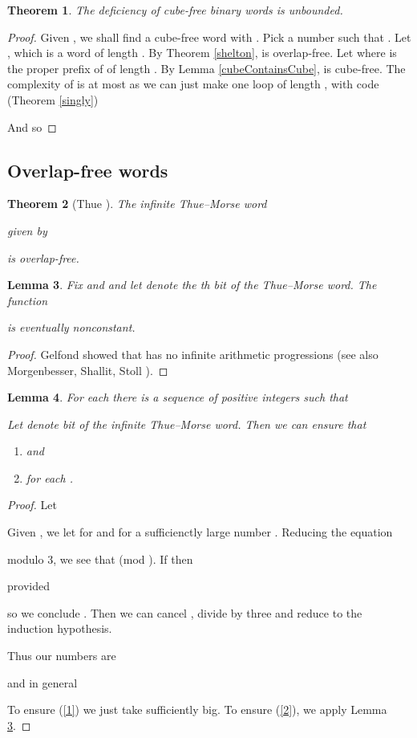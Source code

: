 \documentclass[12pt]{article}
\newcommand{\cubefree}{cube-free}
\theoremstyle{plain}
\newtheorem{thm}{Theorem}
\newtheorem{lem}[thm]{Lemma}
\theoremstyle{definition}
\theoremstyle{remark}
\begin{document}
			\begin{thm}
				The deficiency of {\cubefree} binary words is unbounded.
			\end{thm}
			\begin{proof}
				Given , we shall find a {\cubefree} word  with .
				Pick a number  such that .
				Let , which is a word of length .
				By Theorem \ref{shelton},  is overlap-free.
				Let  where  is the proper prefix of  of length .
				By Lemma \ref{cubeContainsCube},  is {\cubefree}.
				The complexity of  is at most  as
				we can just make one loop of length , with code (Theorem \ref{singly})
				
				And so
				
			\end{proof}
		\subsection{Overlap-free words}
			\begin{thm}[Thue \cite{ThueTwo}]\label{thueStrong}
				The infinite Thue--Morse word
				
				given by
				
				is overlap-free.
			\end{thm}
			\begin{lem}\label{gelfond}
				Fix  and  and let  denote the th bit of the Thue--Morse word. The function
				
				is eventually nonconstant.
			\end{lem}
			\begin{proof}
				Gelfond \cite{MR0220693} showed that  has no infinite arithmetic progressions
				(see also Morgenbesser, Shallit, Stoll \cite{MR2793891}).
			\end{proof}

			\begin{lem}\label{triple9:12:17}
				For each  there is a sequence  of positive integers such that
				
				Let  denote bit  of the infinite Thue--Morse word.
				Then we can ensure that
				\begin{enumerate}
					\item \label{1}  and
					\item \label{2}  for each .
				\end{enumerate}
			\end{lem}
			\begin{proof}
				Let
				
				Given , we let  for  and 
				for a sufficienctly large number .
				Reducing the equation
				
				modulo 3, we see that  (mod ). If  then
				
				
				provided
				
				so we conclude .
				Then we can cancel , divide by three and reduce to the induction hypothesis.


				Thus our numbers are
				
				
				and in general
				
				To ensure (\ref{1}) we just take  sufficiently big.
				To ensure (\ref{2}), we apply Lemma \ref{gelfond}.
			\end{proof}
\end{document}
